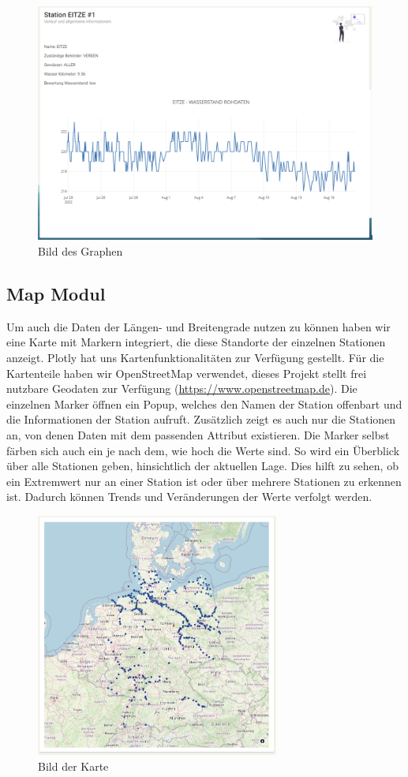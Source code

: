 \begin{figure}[!htb]
 \centering
 \includegraphics[width=12cm]{figures/Graph.PNG}
 \caption{Bild des Graphen}
 \label{fig:Bild des Graphen}
\end{figure}

\newpage
\subsection{Map Modul}

Um auch die Daten der Längen- und Breitengrade nutzen zu können haben wir eine Karte mit Markern integriert, die diese Standorte der einzelnen Stationen anzeigt. Plotly hat uns Kartenfunktionalitäten zur Verfügung gestellt. Für die Kartenteile haben wir OpenStreetMap verwendet, dieses Projekt stellt frei nutzbare Geodaten zur Verfügung (\url{https://www.openstreetmap.de}). Die einzelnen Marker öffnen ein Popup, welches den Namen der Station offenbart und die Informationen der Station aufruft. Zusätzlich zeigt es auch nur die Stationen an, von denen Daten mit dem passenden Attribut existieren. Die Marker selbst färben sich auch ein je nach dem, wie hoch die Werte sind. So wird ein Überblick über alle Stationen geben, hinsichtlich der aktuellen Lage. Dies hilft zu sehen, ob ein Extremwert nur an einer Station ist oder über mehrere Stationen zu erkennen ist. Dadurch können Trends und Veränderungen der Werte verfolgt werden.
\begin{figure}[!htb]
 \centering
 \includegraphics[width=8cm]{figures/Map.PNG}
 \caption{Bild der Karte}
 \label{fig:Bild der Karte}
\end{figure}

